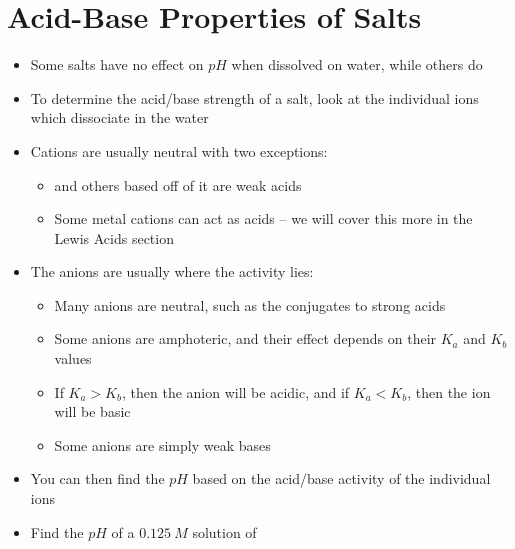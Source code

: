 \documentclass[12pt, openany, letterpaper]{memoir}
\begin{document}
\section{Acid-Base Properties of Salts}
\begin{itemize}
	\item Some salts have no effect on $pH$ when dissolved on water, while others do
	\item To determine the acid/base strength of a salt, look at the individual ions which dissociate in the water
	\item Cations are usually neutral with two exceptions:
	\begin{itemize}
		\item {} and others based off of it are weak acids
		\item Some metal cations can act as acids -- we will cover this more in the Lewis Acids section
	\end{itemize}
	\item The anions are usually where the activity lies:
	\begin{itemize}
		\item Many anions are neutral, such as the conjugates to strong acids
		\item Some anions are amphoteric, and their effect depends on their $K_a$ and $K_b$ values
		\item If $K_a>K_b$, then the anion will be acidic, and if $K_a<K_b$, then the ion will be basic
		\item Some anions are simply weak bases
	\end{itemize}
	\item You can then find the $pH$ based on the acid/base activity of the individual ions
	\item Find the $pH$ of a $0.125~M$ solution of 
\end{itemize}
\end{document}
